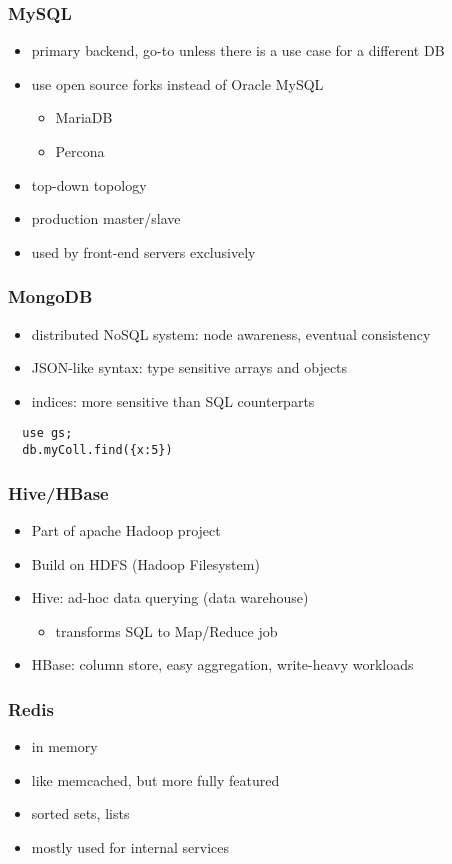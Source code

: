 \documentclass[12pt]{article}
\begin{document}
\subsubsection{MySQL}
\begin{itemize}
  \item primary backend, go-to unless there is a use case for a different DB
  \item {
      use open source forks instead of Oracle MySQL
      \begin{itemize}
        \item MariaDB
        \item Percona
      \end{itemize}
    }
  \item top-down topology
  \item production master/slave
  \item used by front-end servers exclusively
\end{itemize}
\subsubsection{MongoDB}
\begin{itemize}
  \item distributed NoSQL system: node awareness, eventual consistency
  \item JSON-like syntax: type sensitive arrays and objects
  \item indices: more sensitive than SQL counterparts
\end{itemize}
\begin{lstlisting}
  use gs;
  db.myColl.find({x:5})
\end{lstlisting}
\subsubsection{Hive/HBase}
\begin{itemize}
  \item Part of apache Hadoop project
  \item Build on HDFS (Hadoop Filesystem)
  \item {
      Hive: ad-hoc data querying (data warehouse)
      \begin{itemize}
        \item transforms SQL to Map/Reduce job
      \end{itemize}
  }
  \item HBase: column store, easy aggregation, write-heavy workloads
\end{itemize}
\subsubsection{Redis}
\begin{itemize}
  \item in memory
  \item like memcached, but more fully featured
  \item sorted sets, lists
  \item mostly used for internal services
\end{itemize}
\end{document}
